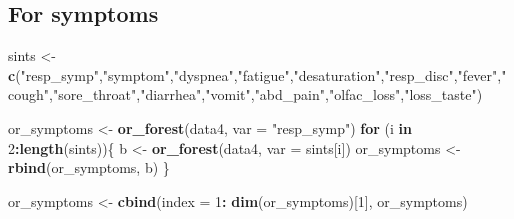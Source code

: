 \documentclass[
]{article}
\newenvironment{Shaded}{\begin{snugshade}}{\end{snugshade}}
\newcommand{\ControlFlowTok}[1]{\textcolor[rgb]{0.13,0.29,0.53}{\textbf{#1}}}
\newcommand{\DataTypeTok}[1]{\textcolor[rgb]{0.13,0.29,0.53}{#1}}
\newcommand{\DecValTok}[1]{\textcolor[rgb]{0.00,0.00,0.81}{#1}}
\newcommand{\KeywordTok}[1]{\textcolor[rgb]{0.13,0.29,0.53}{\textbf{#1}}}
\newcommand{\NormalTok}[1]{#1}
\newcommand{\OperatorTok}[1]{\textcolor[rgb]{0.81,0.36,0.00}{\textbf{#1}}}
\newcommand{\StringTok}[1]{\textcolor[rgb]{0.31,0.60,0.02}{#1}}
\begin{document}
\hypertarget{for-symptoms}{%
\subsection{For symptoms}\label{for-symptoms}}

\begin{Shaded}
\begin{Highlighting}[]
\NormalTok{sints <-}\StringTok{ }\KeywordTok{c}\NormalTok{(}\StringTok{"resp_symp"}\NormalTok{,}\StringTok{"symptom"}\NormalTok{,}\StringTok{"dyspnea"}\NormalTok{,}\StringTok{"fatigue"}\NormalTok{,}\StringTok{"desaturation"}\NormalTok{,}\StringTok{"resp_disc"}\NormalTok{,}\StringTok{"fever"}\NormalTok{,}\StringTok{"cough"}\NormalTok{,}\StringTok{"sore_throat"}\NormalTok{,}\StringTok{"diarrhea"}\NormalTok{,}\StringTok{"vomit"}\NormalTok{,}\StringTok{"abd_pain"}\NormalTok{,}\StringTok{"olfac_loss"}\NormalTok{,}\StringTok{"loss_taste"}\NormalTok{)}

\NormalTok{or_symptoms <-}\StringTok{ }\KeywordTok{or_forest}\NormalTok{(data4, }\DataTypeTok{var =} \StringTok{"resp_symp"}\NormalTok{)}
\ControlFlowTok{for}\NormalTok{ (i }\ControlFlowTok{in} \DecValTok{2}\OperatorTok{:}\KeywordTok{length}\NormalTok{(sints))\{}
\NormalTok{ b <-}\StringTok{ }\KeywordTok{or_forest}\NormalTok{(data4, }\DataTypeTok{var =}\NormalTok{ sints[i])}
\NormalTok{ or_symptoms <-}\StringTok{ }\KeywordTok{rbind}\NormalTok{(or_symptoms, b)}
\NormalTok{\}}

\NormalTok{or_symptoms <-}\StringTok{ }\KeywordTok{cbind}\NormalTok{(}\DataTypeTok{index =} \DecValTok{1}\OperatorTok{:}\StringTok{ }\KeywordTok{dim}\NormalTok{(or_symptoms)[}\DecValTok{1}\NormalTok{], or_symptoms)}


\end{Highlighting}
\end{Shaded}
\end{document}
